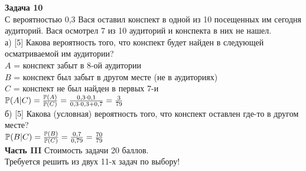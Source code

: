 \documentclass[12pt, a4paper]{article}\usepackage[]{graphicx}\usepackage[]{color}
\begin{document}
{\bf Задача 10} \\
С вероятностью 0,3 Вася оставил конспект в одной из 10 посещенных
им сегодня аудиторий. Вася осмотрел 7 из 10 аудиторий и конспекта
в них не нашел. \\
а) [5] Какова вероятность того, что конспект будет найден в
следующей
осматриваемой им аудитории? \\
$A$ = конспект забыт в 8-ой аудитории \\
$B$ = конспект был забыт в другом месте (не в аудиториях) \\
$C$ = конспект не был найден в первых 7-и \\
$\P(A|C)=\frac{\P(A)}{\P(C)}=\frac{0,3\cdot 0,1}{0,3\cdot
0,3+0,7}=\frac{3}{79}$ \\
б) [5] Какова (условная) вероятность того, что конспект оставлен
где-то в другом месте? \\
$\P(B|C)=\frac{\P(B)}{\P(C)}=\frac{0,7}{0,79}=\frac{70}{79}$ \\

{\bf Часть III} Стоимость задачи 20 баллов. \\

Требуется решить {\bf {}} из двух 11-х задач по
выбору! \\
\end{document}
